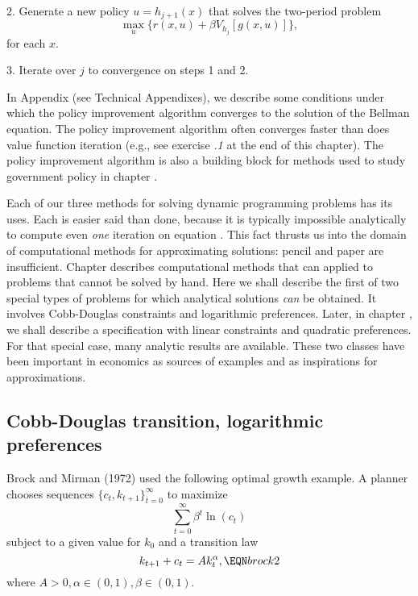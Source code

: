 \item{2.}  Generate a new policy $u=h_{j+1}(x)$ that solves the
two-period problem
$$ \max_u \{r(x,u) + \beta V_{h_j}[g(x,u)]\}  ,$$
for each $x$.
\vskip2cm  %
\item{3.}  Iterate over $j$ to convergence on steps 1 and 2.
\medskip

In  Appendix  (see Technical
 Appendixes),
 we describe some conditions under which the policy improvement algorithm
converges to the solution of the Bellman equation.  The policy improvement algorithm often
converges faster than does value function iteration (e.g., see
exercise {\it \the\chapternum.1\/} at the end of this chapter).
The policy improvement
algorithm is also a building block for methods used to study
government policy in chapter .


     Each of our three  methods for solving dynamic programming problems has its uses. Each is easier said than done,
      because it is typically impossible
analytically to compute even {\it one\/} iteration on equation .
This fact thrusts us into the domain of computational methods for
approximating solutions: pencil and paper are insufficient.
Chapter  describes  computational methods that
can applied to  problems that cannot be solved by hand.
Here  we shall describe the first of two special
types of problems for which analytical solutions {\it can\/} be
obtained.  It involves
 Cobb-Douglas constraints and logarithmic preferences.
Later, in chapter , we shall describe a specification
with linear constraints and quadratic preferences.
For that special case, many analytic results are available.
These two classes have been important in economics as sources of
examples and as inspirations for approximations.
\subsection{Cobb-Douglas transition, logarithmic preferences}
Brock and Mirman (1972) used the following optimal growth
example.
A planner chooses sequences $\{c_t,k_{t+1}\}_{t=0}^\infty$
to maximize
$$ \sum_{t=0}^\infty \beta^t \ln(c_t)$$
subject to a given value for $k_0$ and a transition law
$$ k_{t+1} + c_t = A k_t^\alpha ,\EQN brock2$$
where  $A >0, \alpha \in (0,1), \beta \in (0,1)$.

